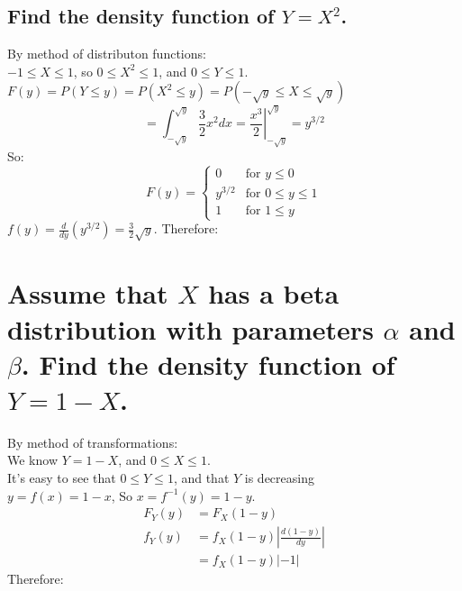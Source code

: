 \documentclass[10pt, letterpaper, titlepage]{article}
\newcommand*\eval[3]{\left.#1\right\rvert_{#2}^{#3}}
\newcommand\abs[1]{\left|#1\right|}
\begin{document}
        \subsection{Find the density function of $Y = X^2$.}
            By method of distributon functions:\\
            $-1 \leq X \leq 1$, so $0 \leq X^2 \leq 1$, and $0 \leq Y \leq 1 $.\\
            $F(y) = P(Y \leq y) = P(X^2 \leq y) = P(-\sqrt{y} \leq X \leq \sqrt{y})$
            \[
                = \int_{-\sqrt{y}}^{\sqrt{y}}{\frac{3}{2}x^2} dx
                = \eval{\frac{x^3}{2}}{-\sqrt{y}}{\sqrt{y}}
                = y^{3/2}
            \]
            So:
            \[
                F(y) =
                \begin{cases}
                    0       & \text{for } y \leq 0\\
                    y^{3/2} & \text{for } 0 \leq y \leq 1\\
                    1       & \text{for } 1 \leq y
                \end{cases}
            \]
            $f(y) = \frac{d}{dy}(y^{3/2}) = \frac{3}{2} \sqrt{y}$.
            Therefore:

    \newpage
    \section{Assume that $X$ has a beta distribution with parameters $\alpha$ and $\beta$.
        Find the density function of $Y = 1 - X$.}
        By method of transformations:\\
        We know $Y = 1 - X$, and $0 \leq X \leq 1$.\\
        It's easy to see that $0 \leq Y \leq 1$, and that $Y$ is decreasing\\
        $y = f(x) = 1 - x$, So $x = f^{-1}(y) = 1 - y$.
        \begin{align*}
            F_Y(y) &= F_X(1 - y) \\
            f_Y(y) &= f_X(1 - y) \abs{\frac{d(1-y)}{dy}}\\
                   &= f_X(1 - y) \abs{-1}
        \end{align*}
        Therefore: 
\end{document}
